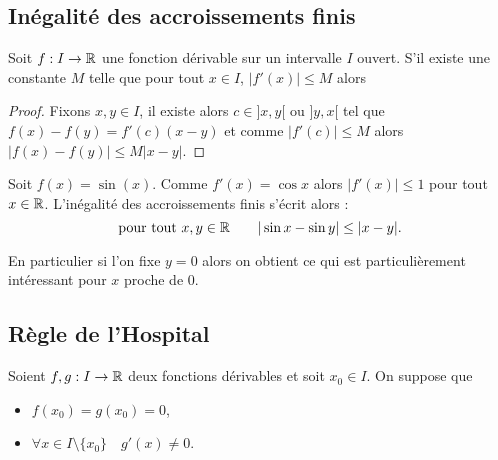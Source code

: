 \documentclass[class=report,crop=false]{standalone}
\begin{document}
\subsection{Inégalité des accroissements finis}


\begin{corollaire}
Soit $f : I \to \mathbb{R}$ une fonction dérivable sur un intervalle $I$ ouvert.
S'il existe une constante $M$ telle que pour tout $x \in I$, $\big|f'(x)\big| \le M$ alors
\end{corollaire}

\begin{proof}
Fixons $x,y \in I$, il existe alors $c\in]x,y[$ ou $]y,x[$ tel que $f(x)-f(y)=f'(c)(x-y)$ et
comme $|f'(c)| \le M$ alors $\big| f(x)-f(y) \big| \le M |x-y|$.
\end{proof}

\begin{exemple}
Soit $f(x)=\sin(x)$. Comme $f'(x)=\cos x$ alors $|f'(x)| \le 1$ pour tout $x\in \mathbb{R}$.
L'inégalité des accroissements finis s'écrit alors :
$$\text{pour tout } x,y \in \mathbb{R} \qquad |\sin x - \sin y | \le |x-y|.$$

En particulier si l'on fixe $y=0$ alors
on obtient
ce qui est particulièrement intéressant pour $x$ proche de $0$.

\end{exemple}


\subsection{Règle de l'Hospital}


\begin{corollaire}
Soient $f,g : I \to \mathbb{R}$ deux fonctions dérivables et soit $x_0\in I$.
On suppose que
\begin{itemize}
  \item $f(x_0)=g(x_0)=0$,
  \item $\forall x \in I\setminus\{x_0\} \quad g'(x)\neq0$.
\end{itemize}
\end{corollaire}
\end{document}
